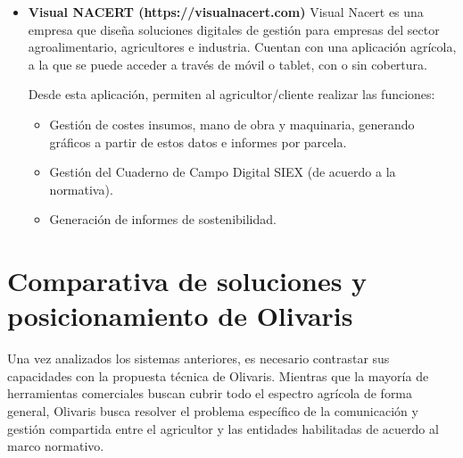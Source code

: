 \begin{itemize}
    Esta aplicación destaca por ofrecer las siguientes funcionalidades:

    \begin{itemize}
        \item Gestión de fincas, cultivos, previsión meteorológica, tratamientos fitosanitarios y recomendaciones personalizadas
        a través del móvil.
        \item Generación de un cuaderno de campo teniendo en cuenta las recomendaciones en materia de Normativa Legal y 
        Protocolos de Calidad.
        \item Posibilidad de generar la finca o parcela a través de la cartografía SIGPAC, pudiendo asignar un propietario.
    \end{itemize}

    \item \textbf{Visual NACERT (https://visualnacert.com)}
    \newline
    Visual Nacert es una empresa que diseña soluciones digitales de gestión para empresas del sector agroalimentario,
    agricultores e industria. Cuentan con una aplicación agrícola, a la que se puede acceder a través de móvil o 
    tablet, con o sin cobertura.

    Desde esta aplicación, permiten al agricultor/cliente realizar las funciones:

    \begin{itemize}
        \item Gestión de costes insumos, mano de obra y maquinaria, generando gráficos a partir de estos datos e 
        informes por parcela.
        \item Gestión del Cuaderno de Campo Digital SIEX (de acuerdo a la normativa).
        \item Generación de informes de sostenibilidad.
    \end{itemize}
\end{itemize}

\section{Comparativa de soluciones y posicionamiento de Olivaris}

Una vez analizados los sistemas anteriores, es necesario contrastar sus capacidades con la propuesta técnica de Olivaris. Mientras 
que la mayoría de herramientas comerciales buscan cubrir todo el espectro agrícola de forma general, Olivaris busca 
resolver el problema específico de la comunicación y gestión compartida entre el agricultor y las entidades habilitadas de acuerdo al 
marco normativo.

